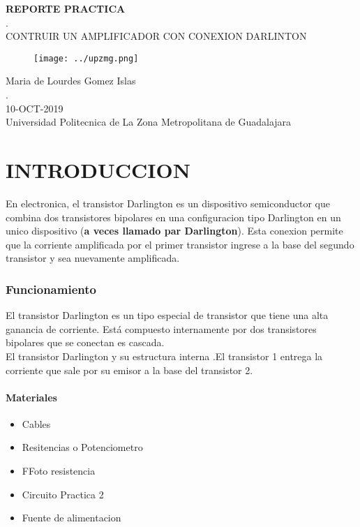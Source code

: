 \documentclass[11pt,a4paper]{article}
\begin{document}
\begin{center}
\textbf{REPORTE PRACTICA}\\
.\\
CONTRUIR UN AMPLIFICADOR CON CONEXION DARLINTON
\end{center}

\begin{figure}[h]
\centering
\texttt{[image: ../upzmg.png]}  
\end{figure}

\begin{center}
Maria de Lourdes Gomez Islas\\
.\\
10-OCT-2019\\
Universidad Politecnica de La Zona Metropolitana de Guadalajara
\end{center}


\newpage 

\part{INTRODUCCION}

En electronica, el transistor Darlington es un dispositivo semiconductor que combina dos transistores bipolares en una configuracion tipo Darlington en un unico dispositivo (\textbf{a veces llamado par Darlington}). Esta conexion permite que la corriente amplificada por el primer transistor ingrese a la base del segundo transistor y sea nuevamente amplificada.

\section{Funcionamiento}
El transistor Darlington es un tipo especial de transistor que tiene una alta ganancia de corriente. Está compuesto internamente por dos transistores bipolares que se conectan es cascada.\\
El transistor Darlington y su estructura interna .El transistor 1 entrega la corriente que sale por su emisor a la base del transistor 2.

\subsection{Materiales}
\begin{itemize}
\item Cables 
\item Resitencias o Potenciometro 
\item FFoto resistencia
\item Circuito Practica 2
\item Fuente de alimentacion 
\end{itemize}
\end{document}
